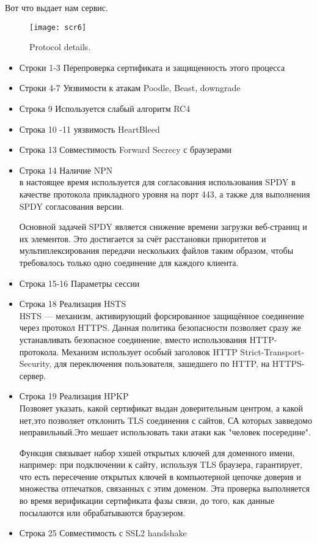 \documentclass{article}
\begin{document}
Вот что выдает нам сервис.
\begin{figure}[h!]
	\centering
	\texttt{[image: scr6]}
	\caption{ Protocol  details.}
\end{figure}
\begin{itemize}
	\item Строки 1-3 Перепроверка сертификата и защищенность этого процесса
	\item Строки 4-7 Уязвимости к атакам Poodle, Beast, downgrade
	\item Строка 9 Используется слабый алгоритм RC4
	\item Строка 10 -11 уязвимость HeartBleed
	\item Строка 13 Совместимость Forward Secrecy с браузерами
	\item Строка 14 Наличие NPN\\
	в настоящее время используется для согласования использования SPDY в качестве протокола прикладного уровня на порт 443, а также для выполнения SPDY согласования версии.
	
	Основной задачей SPDY является снижение времени загрузки веб-страниц и их элементов. Это достигается за счёт расстановки приоритетов и мультиплексирования передачи нескольких файлов таким образом, чтобы требовалось только одно соединение для каждого клиента.
	\item Строка 15-16 Параметры сессии
	\item Строка 18 Реализация HSTS\\
	HSTS — механизм, активирующий форсированное защищённое соединение через протокол HTTPS. Данная политика безопасности позволяет сразу же устанавливать безопасное соединение, вместо использования HTTP-протокола. Механизм использует особый заголовок HTTP Strict-Transport-Security, для переключения пользователя, зашедшего по HTTP, на HTTPS-сервер.
	
	\item Строка 19 Реализация HPKP\\
	 Позвояет указать, какой сертификат выдан доверительным центром, а какой нет,это позволяет отклонить TLS соединения с сайтов, СА которых завведомо неправильный.Это мешает использовать таки атаки как "человек посередине".
	 
	 Функция связывает набор хэшей открытых ключей для доменного имени, например: при подключении к сайту, используя TLS браузера, гарантирует, что есть пересечение открытых ключей в компьютерной цепочке доверия и множества отпечатков, связанных с этим доменом. Эта проверка выполняется во время верификации сертификата фазы связи, до того, как данные посылаются или обрабатываются браузером.
	\item Строка 25 Совместимость с SSL2 handshake
\end{itemize}
\end{document}
